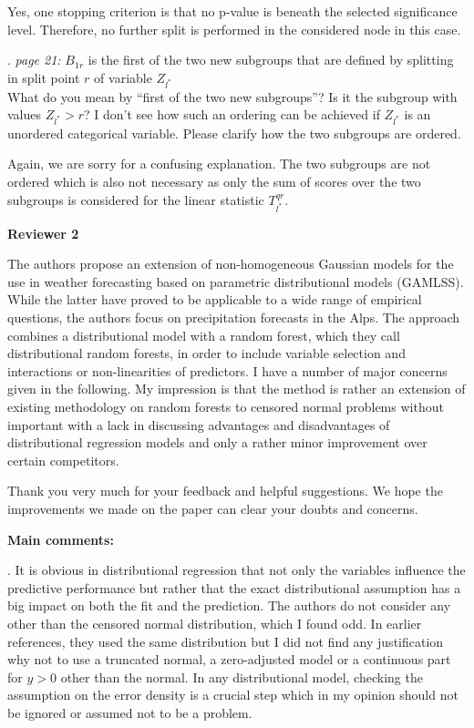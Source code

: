\documentclass[american,foldmarks=false,noconfig]{uibklttr}
\newenvironment{review}{\fontshape{\itdefault}\fontseries{\bfdefault} \selectfont \smallskip}{\par}
\begin{document}
Yes, one stopping criterion is that no p-value is beneath the 
selected significance level. Therefore, no further 
split is performed in the considered node in this case.

\begin{review}
20. {\color{quotecolor}\textit{page 21:} $B_{1r}$ is the first 
of the two new subgroups that are defined by splitting in split 
point $r$ of variable $Z_{l^{\ast}}$}\\
What do you mean by ``first of the two new subgroups''? Is it 
the subgroup with values $Z_{l^{\ast}} > r$? I don't see how 
such an ordering can be achieved if $Z_{l^{\ast}}$ is an 
unordered categorical variable. Please clarify how the two
subgroups are ordered.
\end{review}

Again, we are sorry for a confusing explanation. The two subgroups 
are not ordered which is also not necessary as only the sum of 
scores over the two subgroups is considered for the linear 
statistic $T_{l^{\ast}}^{qr}$.

\newpage


\textbf{\LARGE Reviewer 2}

\begin{review}
The authors propose an extension of non-homogeneous Gaussian models 
for the use in weather forecasting based on parametric distributional 
models (GAMLSS). While the latter have proved to be applicable to a 
wide range of empirical questions, the authors focus on precipitation 
forecasts in the Alps. The approach combines a distributional model 
with a random forest, which they call distributional random forests, 
in order to include variable selection and interactions or 
non-linearities of predictors. I have a number of major concerns 
given in the following. My impression is that the method is rather
an extension of existing methodology on random forests to censored 
normal problems without important with a lack in discussing 
advantages and disadvantages of distributional regression models 
and only a rather minor improvement over certain competitors.
\end{review}

Thank you very much for your feedback and helpful suggestions. We hope 
the improvements we made on the paper can clear your doubts and concerns.

\bigskip

\textbf{Main comments:}

\begin{review}
1. It is obvious in distributional regression that not only the 
variables influence the predictive performance but rather that 
the exact distributional assumption has a big impact on both the 
fit and the prediction. The authors do not consider any other
than the censored normal distribution, which I found odd. 
In earlier references, they used the same distribution but I 
did not find any justification why not to use a truncated normal, 
a zero-adjusted model or a continuous part for $y > 0$ other
than the normal. In any distributional model, checking the 
assumption on the error density is a crucial step which in 
my opinion should not be ignored or assumed not to be a problem.
\end{review}
\end{document}
